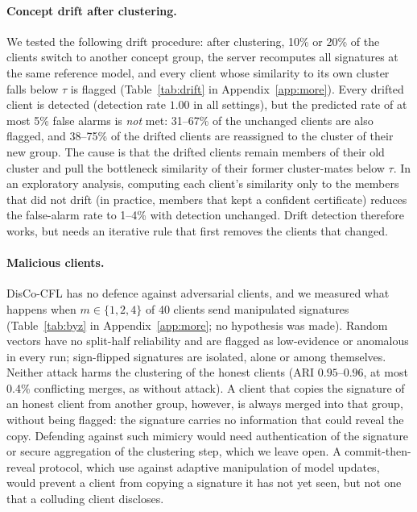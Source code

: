 \paragraph{Concept drift after clustering.} We tested the following drift procedure: after clustering, 10\% or 20\% of the clients switch to another concept group, the server recomputes all signatures at the same reference model, and every client whose similarity to its own cluster falls below $\tau$ is flagged (Table~\ref{tab:drift} in Appendix~\ref{app:more}). Every drifted client is detected (detection rate $1.00$ in all settings), but the predicted rate of at most 5\% false alarms is \emph{not} met: 31--67\% of the unchanged clients are also flagged, and 38--75\% of the drifted clients are reassigned to the cluster of their new group. The cause is that the drifted clients remain members of their old cluster and pull the bottleneck similarity of their former cluster-mates below $\tau$. In an exploratory analysis, computing each client's similarity only to the members that did not drift (in practice, members that kept a confident certificate) reduces the false-alarm rate to 1--4\% with detection unchanged. Drift detection therefore works, but needs an iterative rule that first removes the clients that changed.



\paragraph{Malicious clients.} DisCo-CFL has no defence against adversarial clients, and we measured what happens when $m\in\{1,2,4\}$ of 40 clients send manipulated signatures (Table~\ref{tab:byz} in Appendix~\ref{app:more}; no hypothesis was made). Random vectors have no split-half reliability and are flagged as low-evidence or anomalous in every run; sign-flipped signatures are isolated, alone or among themselves. Neither attack harms the clustering of the honest clients (ARI $0.95$--$0.96$, at most 0.4\% conflicting merges, as without attack). A client that copies the signature of an honest client from another group, however, is always merged into that group, without being flagged: the signature carries no information that could reveal the copy. Defending against such mimicry would need authentication of the signature or secure aggregation of the clustering step, which we leave open. A commit-then-reveal protocol, which \citet{dang2026fortress} use against adaptive manipulation of model updates, would prevent a client from copying a signature it has not yet seen, but not one that a colluding client discloses.



